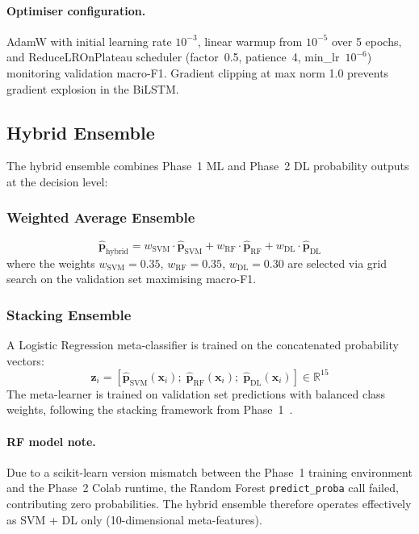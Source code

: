\documentclass[11pt,a4paper]{article}
\begin{document}
\paragraph{Optimiser configuration.}
AdamW with initial learning rate $10^{-3}$, linear warmup from
$10^{-5}$ over 5 epochs, and ReduceLROnPlateau scheduler
(factor~0.5, patience~4, min\_lr~$10^{-6}$) monitoring validation
macro-F1. Gradient clipping at max norm 1.0 prevents gradient
explosion in the BiLSTM.

\subsection{Hybrid Ensemble}
\label{sec:hybrid}

The hybrid ensemble combines Phase~1 ML and Phase~2 DL probability
outputs at the decision level:

\subsubsection{Weighted Average Ensemble}

\begin{equation}
  \hat{\mathbf{p}}_{\text{hybrid}} = w_{\text{SVM}} \cdot
  \hat{\mathbf{p}}_{\text{SVM}} + w_{\text{RF}} \cdot
  \hat{\mathbf{p}}_{\text{RF}} + w_{\text{DL}} \cdot
  \hat{\mathbf{p}}_{\text{DL}}
  \label{eq:weighted}
\end{equation}
where the weights $w_{\text{SVM}} = 0.35$, $w_{\text{RF}} = 0.35$,
$w_{\text{DL}} = 0.30$ are selected via grid search on the validation
set maximising macro-F1.

\subsubsection{Stacking Ensemble}

A Logistic Regression meta-classifier is trained on the concatenated
probability vectors:
\begin{equation}
  \mathbf{z}_i = [\hat{\mathbf{p}}_{\text{SVM}}(\mathbf{x}_i);\;
  \hat{\mathbf{p}}_{\text{RF}}(\mathbf{x}_i);\;
  \hat{\mathbf{p}}_{\text{DL}}(\mathbf{x}_i)] \in \mathbb{R}^{15}
  \label{eq:stacking}
\end{equation}
The meta-learner is trained on validation set predictions with
balanced class weights, following the stacking framework from
Phase~1~\cite{wolpert1992stacked}.

\paragraph{RF model note.}
Due to a scikit-learn version mismatch between the Phase~1 training
environment and the Phase~2 Colab runtime, the Random Forest
\texttt{predict\_proba} call failed, contributing zero probabilities.
The hybrid ensemble therefore operates effectively as SVM + DL only
(10-dimensional meta-features).
\end{document}
